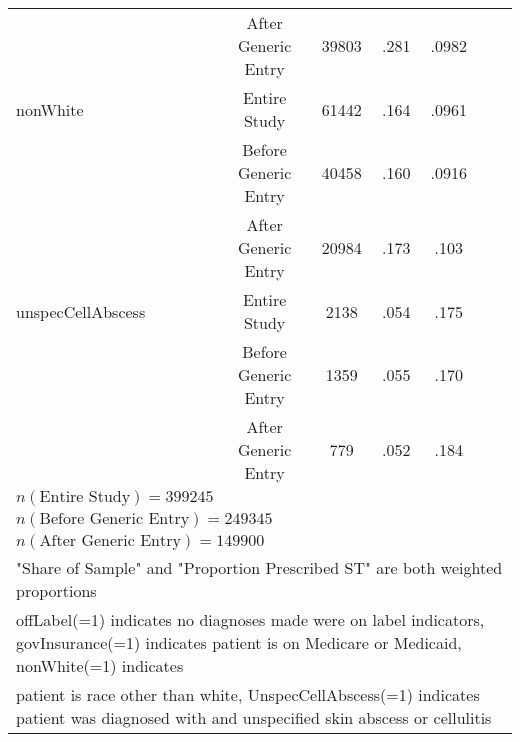 \begin{table}[htbp]
\begin{tabular}{l*{6}{c}}
                          &     After Generic Entry&      39803 &      .281&     .0982\\
[1em]
nonWhite                  &     Entire Study&             61442&      .164&     .0961\\
                          &     Before Generic Entry&     40458&      .160&     .0916\\
                          &     After Generic Entry&      20984&      .173&     .103\\
[1em]
unspecCellAbscess         &     Entire Study&             2138 &      .054&     .175\\
                          &     Before Generic Entry&     1359 &      .055&     .170\\
                          &     After Generic Entry&      779  &      .052&     .184\\
\hline
$n(\text{Entire Study}) = 399245$\\
$n(\text{Before Generic Entry}) = 249345$\\
$n(\text{After Generic Entry}) = 149900$\\
\hline\hline
\multicolumn{7}{l}{"Share of Sample" and "Proportion Prescribed ST" are both weighted proportions}\\
\multicolumn{7}{l}{offLabel(=1) indicates no diagnoses made were on label indicators, govInsurance(=1) indicates patient is on Medicare or Medicaid, nonWhite(=1) indicates}\\
\multicolumn{7}{l}{patient is race other than white, UnspecCellAbscess(=1) indicates patient was diagnosed with and unspecified skin abscess or cellulitis}\\
\end{tabular}
\label{tab:Table4.x}
\end{table}
